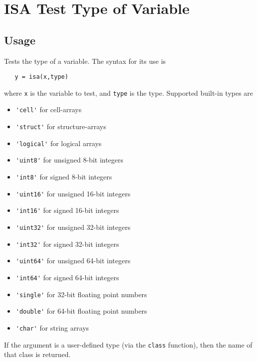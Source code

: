 \section{ISA Test Type of Variable}

\subsection{Usage}

Tests the type of a variable.  The syntax for its
use is
\begin{verbatim}
   y = isa(x,type)
\end{verbatim}
where \verb|x| is the variable to test, and \verb|type| is
the type.  Supported built-in types are
\begin{itemize}
\item  \verb|'cell'| for cell-arrays

\item  \verb|'struct'| for structure-arrays

\item  \verb|'logical'| for logical arrays

\item  \verb|'uint8'| for unsigned 8-bit integers

\item  \verb|'int8'| for signed 8-bit integers

\item  \verb|'uint16'| for unsigned 16-bit integers

\item  \verb|'int16'| for signed 16-bit integers

\item  \verb|'uint32'| for unsigned 32-bit integers

\item  \verb|'int32'| for signed 32-bit integers

\item  \verb|'uint64'| for unsigned 64-bit integers

\item  \verb|'int64'| for signed 64-bit integers

\item  \verb|'single'| for 32-bit floating point numbers

\item  \verb|'double'| for 64-bit floating point numbers

\item  \verb|'char'| for string arrays

\end{itemize}
If the argument is a user-defined type (via the \verb|class| function), then
the name of that class is returned.

